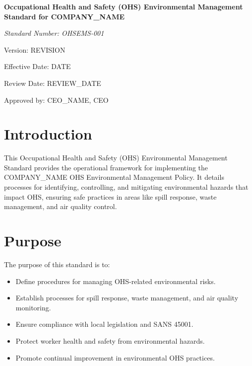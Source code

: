 \documentclass[12pt]{article}
\begin{document}
\begin{titlepage}
    \centering
    \vspace*{2cm}
    {\LARGE\bfseries Occupational Health and Safety (OHS) Environmental Management Standard for {{COMPANY_NAME}}\par}
    \vspace{1cm}
    {\large\itshape Standard Number: OHSEMS-001\par}
    \vspace{0.5cm}
    {\normalsize Version: {{REVISION}}\par}
    \vspace{0.5cm}
    {\normalsize Effective Date: {{DATE}}\par}
    \vspace{0.5cm}
    {\normalsize Review Date: {{REVIEW_DATE}}\par}
    \vspace{2cm}
    {\normalsize Approved by: {{CEO_NAME}}, CEO\par}
\end{titlepage}

\section{Introduction}
This Occupational Health and Safety (OHS) Environmental Management Standard provides the operational framework for implementing the {{COMPANY_NAME}} OHS Environmental Management Policy. It details processes for identifying, controlling, and mitigating environmental hazards that impact OHS, ensuring safe practices in areas like spill response, waste management, and air quality control.

\section{Purpose}
The purpose of this standard is to:
\begin{itemize}
    \item Define procedures for managing OHS-related environmental risks.
    \item Establish processes for spill response, waste management, and air quality monitoring.
    \item Ensure compliance with local legislation and SANS 45001.
    \item Protect worker health and safety from environmental hazards.
    \item Promote continual improvement in environmental OHS practices.
\end{itemize}
\end{document}
